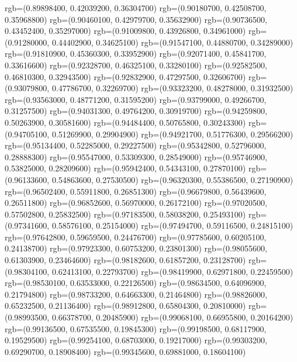 {{        rgb=(0.89898400, 0.42039200, 0.36304700)
        rgb=(0.90180700, 0.42508700, 0.35968800)
        rgb=(0.90460100, 0.42979700, 0.35632900)
        rgb=(0.90736500, 0.43452400, 0.35297000)
        rgb=(0.91009800, 0.43926800, 0.34961000)
        rgb=(0.91280000, 0.44402900, 0.34625100)
        rgb=(0.91547100, 0.44880700, 0.34289000)
        rgb=(0.91810900, 0.45360300, 0.33952900)
        rgb=(0.92071400, 0.45841700, 0.33616600)
        rgb=(0.92328700, 0.46325100, 0.33280100)
        rgb=(0.92582500, 0.46810300, 0.32943500)
        rgb=(0.92832900, 0.47297500, 0.32606700)
        rgb=(0.93079800, 0.47786700, 0.32269700)
        rgb=(0.93323200, 0.48278000, 0.31932500)
        rgb=(0.93563000, 0.48771200, 0.31595200)
        rgb=(0.93799000, 0.49266700, 0.31257500)
        rgb=(0.94031300, 0.49764200, 0.30919700)
        rgb=(0.94259800, 0.50263900, 0.30581600)
        rgb=(0.94484400, 0.50765800, 0.30243300)
        rgb=(0.94705100, 0.51269900, 0.29904900)
        rgb=(0.94921700, 0.51776300, 0.29566200)
        rgb=(0.95134400, 0.52285000, 0.29227500)
        rgb=(0.95342800, 0.52796000, 0.28888300)
        rgb=(0.95547000, 0.53309300, 0.28549000)
        rgb=(0.95746900, 0.53825000, 0.28209600)
        rgb=(0.95942400, 0.54343100, 0.27870100)
        rgb=(0.96133600, 0.54863600, 0.27530500)
        rgb=(0.96320300, 0.55386500, 0.27190900)
        rgb=(0.96502400, 0.55911800, 0.26851300)
        rgb=(0.96679800, 0.56439600, 0.26511800)
        rgb=(0.96852600, 0.56970000, 0.26172100)
        rgb=(0.97020500, 0.57502800, 0.25832500)
        rgb=(0.97183500, 0.58038200, 0.25493100)
        rgb=(0.97341600, 0.58576100, 0.25154000)
        rgb=(0.97494700, 0.59116500, 0.24815100)
        rgb=(0.97642800, 0.59659500, 0.24476700)
        rgb=(0.97785600, 0.60205100, 0.24138700)
        rgb=(0.97923300, 0.60753200, 0.23801300)
        rgb=(0.98055600, 0.61303900, 0.23464600)
        rgb=(0.98182600, 0.61857200, 0.23128700)
        rgb=(0.98304100, 0.62413100, 0.22793700)
        rgb=(0.98419900, 0.62971800, 0.22459500)
        rgb=(0.98530100, 0.63533000, 0.22126500)
        rgb=(0.98634500, 0.64096900, 0.21794800)
        rgb=(0.98733200, 0.64663300, 0.21464800)
        rgb=(0.98826000, 0.65232500, 0.21136400)
        rgb=(0.98912800, 0.65804300, 0.20810000)
        rgb=(0.98993500, 0.66378700, 0.20485900)
        rgb=(0.99068100, 0.66955800, 0.20164200)
        rgb=(0.99136500, 0.67535500, 0.19845300)
        rgb=(0.99198500, 0.68117900, 0.19529500)
        rgb=(0.99254100, 0.68703000, 0.19217000)
        rgb=(0.99303200, 0.69290700, 0.18908400)
        rgb=(0.99345600, 0.69881000, 0.18604100)
}}
